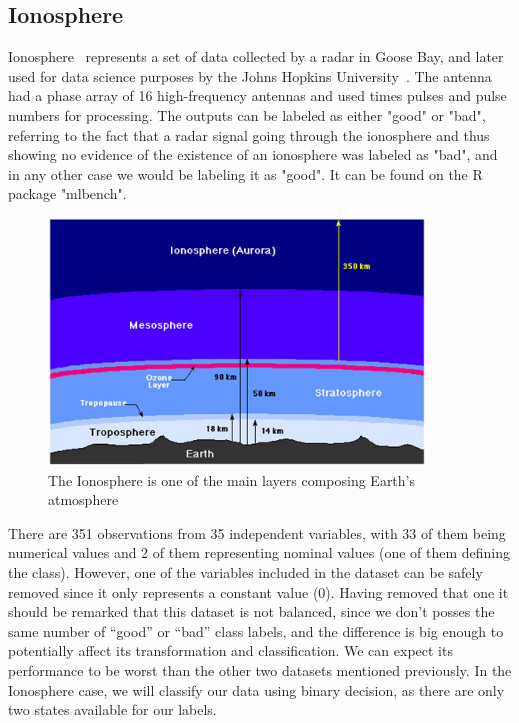 \subsection{Ionosphere}
\label{subsec:Ionosphere}

Ionosphere~\cite{Ionosphere_article} represents a set of data collected by a radar in Goose Bay, and later used for data science purposes by the Johns Hopkins University~\cite{citation}. The antenna had a phase array of 16 high-frequency antennas and used times pulses and pulse numbers for processing. The outputs can be labeled as either "good" or "bad", referring to the fact that a radar signal going through the ionosphere and thus showing no evidence of the existence of an ionosphere was labeled as "bad", and in any other case we would be labeling it as "good". It can be found on the R package "mlbench". %
%
\begin{figure}[H]
	\centering
	\includegraphics[width=10cm]{Figuras_tfg/Ionosphere}
	\caption{The Ionosphere is one of the main layers composing Earth's atmosphere}
	\label{fig:figure_pairs_ionosp}
\end{figure}

There are 351 observations from 35 independent variables, with 33 of them being numerical values and 2 of them representing nominal values (one of them defining the class). However, one of the variables included in the dataset can be safely removed since it only represents a constant value (0). Having removed that one it should be remarked that this dataset is not balanced, since we don't posses the same number of ``good'' or ``bad'' class labels, and the difference is big enough to potentially affect its transformation and classification. We can expect its performance to be worst than the other two datasets mentioned previously. In the Ionosphere case, we will classify our data using binary decision, as there are only two states available for our labels. \par

